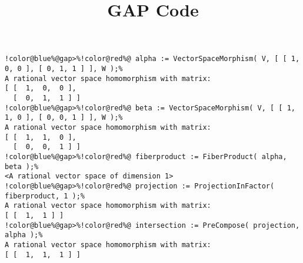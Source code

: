 \documentclass[12pt]{amsart}
\title{GAP Code}
\author{}
\begin{document}
\maketitle

\begin{Verbatim}[commandchars=!@\%,frame=single]
!color@blue%@gap>%!color@red%@ alpha := VectorSpaceMorphism( V, [ [ 1, 0, 0 ], [ 0, 1, 1 ] ], W );%
A rational vector space homomorphism with matrix: 
[ [  1,  0,  0 ],
  [  0,  1,  1 ] ]
!color@blue%@gap>%!color@red%@ beta := VectorSpaceMorphism( V, [ [ 1, 1, 0 ], [ 0, 0, 1 ] ], W );%
A rational vector space homomorphism with matrix: 
[ [  1,  1,  0 ],
  [  0,  0,  1 ] ]
!color@blue%@gap>%!color@red%@ fiberproduct := FiberProduct( alpha, beta );%
<A rational vector space of dimension 1>
!color@blue%@gap>%!color@red%@ projection := ProjectionInFactor( fiberproduct, 1 );%
A rational vector space homomorphism with matrix: 
[ [  1,  1 ] ]
!color@blue%@gap>%!color@red%@ intersection := PreCompose( projection, alpha );%
A rational vector space homomorphism with matrix: 
[ [  1,  1,  1 ] ]
\end{Verbatim}
\end{document}

